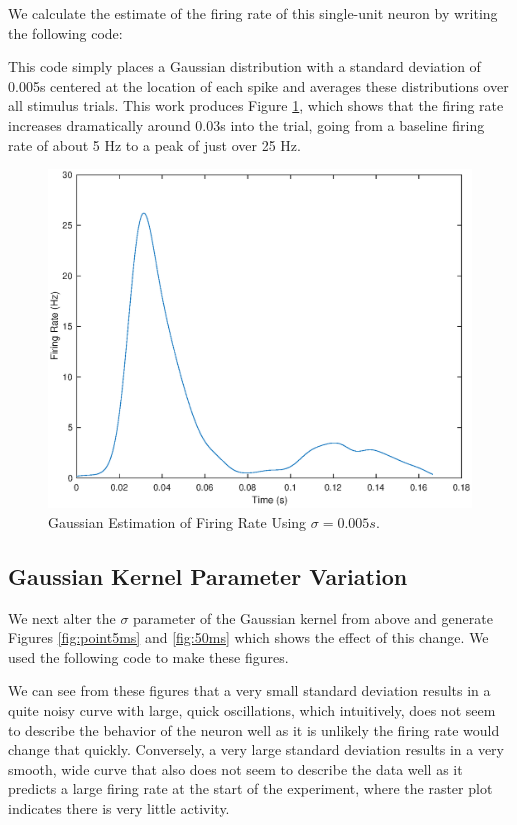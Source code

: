 \documentclass[11pt, oneside]{article}
\begin{document}
We calculate the estimate of the firing rate of this single-unit neuron by writing the following code:

This code simply places a Gaussian distribution with a standard deviation of 0.005s centered at the location of each spike and averages these distributions over all stimulus trials. This work produces Figure \ref{fig:Gaussian}, which shows that the firing rate increases dramatically around 0.03s into the trial, going from a baseline firing rate of about 5 Hz to a peak of just over 25 Hz.

\begin{figure}[ht!]
\includegraphics[width=1\textwidth]{fivemillisecondplot.eps}
\caption{Gaussian Estimation of Firing Rate Using $\sigma = 0.005s$.}
\label{fig:Gaussian}
\end{figure}

\subsection{Gaussian Kernel Parameter Variation}

We next alter the $\sigma$ parameter of the Gaussian kernel from above and generate Figures \ref{fig:point5ms} and \ref{fig:50ms} which shows the effect of this change. We used the following code to make these figures.

We can see from these figures that a very small standard deviation results in a quite noisy curve with large, quick oscillations, which intuitively, does not seem to describe the behavior of the neuron well as it is unlikely the firing rate would change that quickly. Conversely, a very large standard deviation results in a very smooth, wide curve that also does not seem to describe the data well as it predicts a large firing rate at the start of the experiment, where the raster plot indicates there is very little activity.
\end{document}
